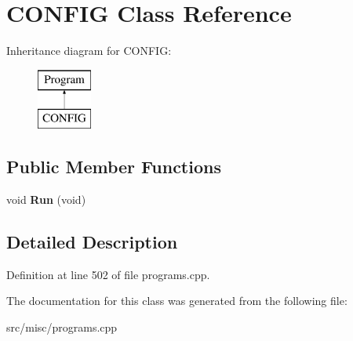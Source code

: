 \hypertarget{classCONFIG}{\section{C\-O\-N\-F\-I\-G Class Reference}
\label{classCONFIG}
}
Inheritance diagram for C\-O\-N\-F\-I\-G\-:\begin{figure}[H]
\begin{center}
\leavevmode
\includegraphics[height=2.000000cm]{classCONFIG}
\end{center}
\end{figure}
\subsection*{Public Member Functions}
\begin{DoxyCompactItemize}
\item 
\hypertarget{classCONFIG_a70fa41a171a274d6f1ef63cbfd2928ef}{void {\bfseries Run} (void)}\label{classCONFIG_a70fa41a171a274d6f1ef63cbfd2928ef}

\end{DoxyCompactItemize}


\subsection{Detailed Description}


Definition at line 502 of file programs.\-cpp.



The documentation for this class was generated from the following file\-:\begin{DoxyCompactItemize}
\item 
src/misc/programs.\-cpp\end{DoxyCompactItemize}
